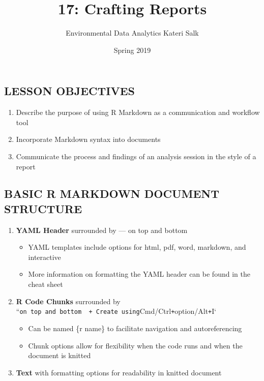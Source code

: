 \documentclass[]{article}
\title{17: Crafting Reports}
\author{Environmental Data Analytics \textbar{} Kateri Salk}
\date{Spring 2019}
\providecommand{\tightlist}{%
  \setlength{\itemsep}{0pt}\setlength{\parskip}{0pt}}
\begin{document}
\maketitle

\hypertarget{lesson-objectives}{%
\subsection{LESSON OBJECTIVES}\label{lesson-objectives}}

\begin{enumerate}
\def\labelenumi{\arabic{enumi}.}
\tightlist
\item
  Describe the purpose of using R Markdown as a communication and
  workflow tool
\item
  Incorporate Markdown syntax into documents
\item
  Communicate the process and findings of an analysis session in the
  style of a report
\end{enumerate}

\hypertarget{basic-r-markdown-document-structure}{%
\subsection{BASIC R MARKDOWN DOCUMENT
STRUCTURE}\label{basic-r-markdown-document-structure}}

\begin{enumerate}
\def\labelenumi{\arabic{enumi}.}
\tightlist
\item
  \textbf{YAML Header} surrounded by --- on top and bottom

  \begin{itemize}
  \tightlist
  \item
    YAML templates include options for html, pdf, word, markdown, and
    interactive
  \item
    More information on formatting the YAML header can be found in the
    cheat sheet
  \end{itemize}
\item
  \textbf{R Code Chunks} surrounded by
  ``\texttt{on\ top\ and\ bottom\ \ +\ Create\ using}Cmd/Ctrl\texttt{+}option/Alt\texttt{+}I`

  \begin{itemize}
  \tightlist
  \item
    Can be named \{r name\} to facilitate navigation and autoreferencing
  \item
    Chunk options allow for flexibility when the code runs and when the
    document is knitted
  \end{itemize}
\item
  \textbf{Text} with formatting options for readability in knitted
  document
\end{enumerate}
\end{document}

